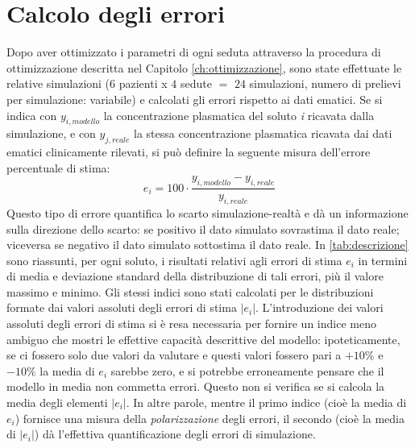\section{Calcolo degli errori}
Dopo aver ottimizzato i parametri di ogni seduta attraverso la procedura di ottimizzazione descritta nel Capitolo \ref{ch:ottimizzazione}, sono state effettuate le relative simulazioni ($6$ pazienti x $4$ sedute $=$ $24$ simulazioni, numero di prelievi per simulazione: variabile) e calcolati gli errori rispetto ai dati ematici. Se si indica con $y_{i,modello}$ la concentrazione plasmatica del soluto \textit{i} ricavata dalla simulazione, e con $y_{j,reale}$ la stessa concentrazione plasmatica ricavata dai dati ematici clinicamente rilevati, si può definire la seguente misura dell'errore percentuale di stima:
\begin{equation}\label{eq:errori}
	e_i = 100 \cdot \frac{y_{i,modello}-y_{i,reale}}{y_{i,reale}}
\end{equation}
Questo tipo di errore quantifica lo scarto simulazione-realtà e dà un informazione sulla direzione dello scarto: se positivo il dato simulato sovrastima il dato reale; viceversa se negativo il dato simulato sottostima il dato reale. In \tablename\ref{tab:descrizione} sono riassunti, per ogni soluto, i risultati relativi agli errori di stima $e_i$ in termini di media e deviazione standard della distribuzione di tali errori, più il valore massimo e minimo. Gli stessi indici sono stati calcolati per le distribuzioni formate dai valori assoluti degli errori di stima $|e_i|$. L'introduzione dei valori assoluti degli errori di stima si è resa necessaria per fornire un indice meno ambiguo che mostri le effettive capacità descrittive del modello: ipoteticamente, se ci fossero solo due valori da valutare e questi valori fossero pari a $+10\%$ e $-10\%$ la media di $e_i$ sarebbe zero, e si potrebbe erroneamente pensare che il modello in media non commetta errori. Questo non si verifica se si calcola la media degli elementi $|e_i|$. In altre parole, mentre il primo indice (cioè la media di $e_i$) fornisce una misura della \textit{polarizzazione} degli errori, il secondo (cioè la media di $|e_i|$) dà l'effettiva quantificazione degli errori di simulazione.

